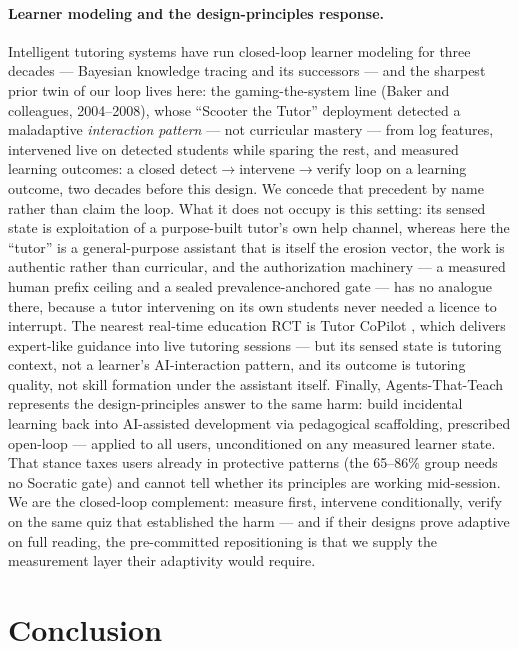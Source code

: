 \documentclass[11pt]{article}
\begin{document}
\paragraph{Learner modeling and the design-principles response.}
Intelligent tutoring systems have run closed-loop learner modeling for three decades --- Bayesian knowledge tracing \citep{corbett1995knowledge} and its successors --- and the sharpest prior twin of our loop lives here: the gaming-the-system line (Baker and colleagues, 2004--2008), whose ``Scooter the Tutor'' deployment detected a maladaptive \emph{interaction pattern} --- not curricular mastery --- from log features, intervened live on detected students while sparing the rest, and measured learning outcomes: a closed detect$\to$intervene$\to$verify loop on a learning outcome, two decades before this design. We concede that precedent by name rather than claim the loop. What it does not occupy is this setting: its sensed state is exploitation of a purpose-built tutor's own help channel, whereas here the ``tutor'' is a general-purpose assistant that is itself the erosion vector, the work is authentic rather than curricular, and the authorization machinery --- a measured human prefix ceiling and a sealed prevalence-anchored gate --- has no analogue there, because a tutor intervening on its own students never needed a licence to interrupt. The nearest real-time education RCT is Tutor CoPilot \citep{wang2024tutorcopilot}, which delivers expert-like guidance into live tutoring sessions --- but its sensed state is tutoring context, not a learner's AI-interaction pattern, and its outcome is tutoring quality, not skill formation under the assistant itself. Finally, Agents-That-Teach \citep{mehra2026agents} represents the design-principles answer to the same harm: build incidental learning back into AI-assisted development via pedagogical scaffolding, prescribed open-loop --- applied to all users, unconditioned on any measured learner state. That stance taxes users already in protective patterns (the 65--86\% group needs no Socratic gate) and cannot tell whether its principles are working mid-session. We are the closed-loop complement: measure first, intervene conditionally, verify on the same quiz that established the harm --- and if their designs prove adaptive on full reading, the pre-committed repositioning is that we supply the measurement layer their adaptivity would require.

\section{Conclusion}
\end{document}
